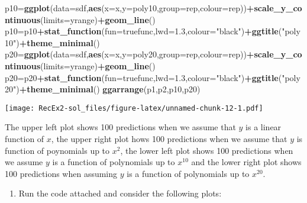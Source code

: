 \documentclass[]{article}
\newenvironment{Shaded}{\begin{snugshade}}{\end{snugshade}}
\newcommand{\DataTypeTok}[1]{\textcolor[rgb]{0.13,0.29,0.53}{#1}}
\newcommand{\FloatTok}[1]{\textcolor[rgb]{0.00,0.00,0.81}{#1}}
\newcommand{\KeywordTok}[1]{\textcolor[rgb]{0.13,0.29,0.53}{\textbf{#1}}}
\newcommand{\NormalTok}[1]{#1}
\newcommand{\OperatorTok}[1]{\textcolor[rgb]{0.81,0.36,0.00}{\textbf{#1}}}
\newcommand{\StringTok}[1]{\textcolor[rgb]{0.31,0.60,0.02}{#1}}
\providecommand{\tightlist}{%
  \setlength{\itemsep}{0pt}\setlength{\parskip}{0pt}}
\begin{document}
\begin{Shaded}
\begin{Highlighting}[]
\NormalTok{p10=}\KeywordTok{ggplot}\NormalTok{(}\DataTypeTok{data=}\NormalTok{sdf,}\KeywordTok{aes}\NormalTok{(}\DataTypeTok{x=}\NormalTok{x,}\DataTypeTok{y=}\NormalTok{poly10,}\DataTypeTok{group=}\NormalTok{rep,}\DataTypeTok{colour=}\NormalTok{rep))}\OperatorTok{+}\KeywordTok{scale_y_continuous}\NormalTok{(}\DataTypeTok{limits=}\NormalTok{yrange)}\OperatorTok{+}\KeywordTok{geom_line}\NormalTok{()}
\NormalTok{p10=p10}\OperatorTok{+}\KeywordTok{stat_function}\NormalTok{(}\DataTypeTok{fun=}\NormalTok{truefunc,}\DataTypeTok{lwd=}\FloatTok{1.3}\NormalTok{,}\DataTypeTok{colour=}\StringTok{"black"}\NormalTok{)}\OperatorTok{+}\KeywordTok{ggtitle}\NormalTok{(}\StringTok{"poly10"}\NormalTok{)}\OperatorTok{+}\KeywordTok{theme_minimal}\NormalTok{()}
\NormalTok{p20=}\KeywordTok{ggplot}\NormalTok{(}\DataTypeTok{data=}\NormalTok{sdf,}\KeywordTok{aes}\NormalTok{(}\DataTypeTok{x=}\NormalTok{x,}\DataTypeTok{y=}\NormalTok{poly20,}\DataTypeTok{group=}\NormalTok{rep,}\DataTypeTok{colour=}\NormalTok{rep))}\OperatorTok{+}\KeywordTok{scale_y_continuous}\NormalTok{(}\DataTypeTok{limits=}\NormalTok{yrange)}\OperatorTok{+}\KeywordTok{geom_line}\NormalTok{()}
\NormalTok{p20=p20}\OperatorTok{+}\KeywordTok{stat_function}\NormalTok{(}\DataTypeTok{fun=}\NormalTok{truefunc,}\DataTypeTok{lwd=}\FloatTok{1.3}\NormalTok{,}\DataTypeTok{colour=}\StringTok{"black"}\NormalTok{)}\OperatorTok{+}\KeywordTok{ggtitle}\NormalTok{(}\StringTok{"poly20"}\NormalTok{)}\OperatorTok{+}\KeywordTok{theme_minimal}\NormalTok{()}
\KeywordTok{ggarrange}\NormalTok{(p1,p2,p10,p20)}
\end{Highlighting}
\end{Shaded}

\texttt{[image: RecEx2-sol\_files/figure-latex/unnamed-chunk-12-1.pdf]}

The upper left plot shows 100 predictions when we assume that \(y\) is a
linear function of \(x\), the upper right plot hows 100 predictions when
we assume that \(y\) is function of poynomials up to \(x^2\), the lower
left plot shows 100 predictions when we assume \(y\) is a function of
polynomials up to \(x^{10}\) and the lower right plot shows 100
predictions when assuming \(y\) is a function of polynomials up to
\(x^{20}\).

\begin{enumerate}
\def\labelenumi{\alph{enumi})}
\setcounter{enumi}{1}
\tightlist
\item
  Run the code attached and consider the following plots:
\end{enumerate}
\end{document}
